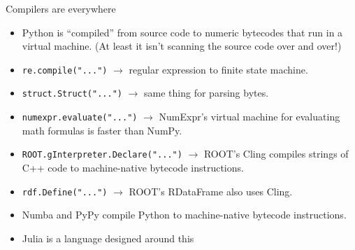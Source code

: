 \documentclass[aspectratio=169]{beamer}
\begin{document}
\begin{frame}{Compilers are everywhere}
\large
\vspace{0.35 cm}

\begin{itemize}\setlength{\itemsep}{0.27 cm}
\item Python is ``compiled'' from source code to numeric bytecodes that run in a virtual machine. (At least it isn't scanning the source code over and over!)
\item \texttt{re.compile("...")} $\longrightarrow$ regular expression to finite state machine.
\item \texttt{struct.Struct("...")} $\longrightarrow$ same thing for parsing bytes.
\item \texttt{numexpr.evaluate("...")} $\longrightarrow$ NumExpr's virtual machine for evaluating math formulas is faster than NumPy.
\item \texttt{ROOT.gInterpreter.Declare("...")} $\longrightarrow$ ROOT's Cling compiles strings of C++ code to machine-native bytecode instructions.
\item \texttt{rdf.Define("...")} $\longrightarrow$ ROOT's RDataFrame also uses Cling.
\item Numba and PyPy compile Python to machine-native bytecode instructions.
\item Julia is a language designed around this 
\end{itemize}
\end{frame}
\end{document}
